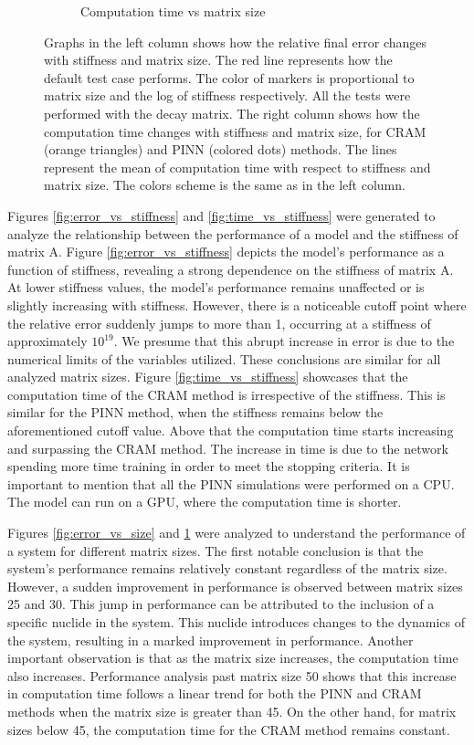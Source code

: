 \documentclass[10pt]{article}
\begin{document}
\begin{figure}
\begin{subfigure}[b]{0.48\textwidth}
         \caption{Computation time vs matrix size}
         \label{fig:time_vs_size}
     \end{subfigure}
        \caption{Graphs in the left column shows how the relative final error changes with stiffness and matrix size. The red line represents how the default test case performs. The color of markers is proportional to matrix size and the log of stiffness respectively. All the tests were performed with the decay matrix. The right column shows how the computation time changes with stiffness and matrix size, for CRAM (orange triangles) and PINN (colored dots) methods. The lines represent the mean of computation time with respect to stiffness and matrix size. The colors scheme is the same as in the left column.}
        \label{fig:three graphs}
\end{figure}

Figures \ref{fig:error_vs_stiffness} and \ref{fig:time_vs_stiffness} were generated to analyze the relationship between the performance of a model and the stiffness of matrix A. Figure \ref{fig:error_vs_stiffness} depicts the model's performance as a function of stiffness, revealing a strong dependence on the stiffness of matrix A. At lower stiffness values, the model's performance remains unaffected or is slightly increasing with stiffness. However, there is a noticeable cutoff point where the relative error suddenly jumps to more than 1, occurring at a stiffness of approximately $10^{19}$. We presume that this abrupt increase in error is due to the numerical limits of the variables utilized. These conclusions are similar for all analyzed matrix sizes. Figure \ref{fig:time_vs_stiffness} showcases that the computation time of the CRAM method is irrespective of the stiffness. This is similar for the PINN method, when the stiffness remains below the aforementioned cutoff value. Above that the computation time starts increasing and surpassing the CRAM method. The increase in time is due to the network spending more time training in order to meet the stopping criteria. It is important to mention that all the PINN simulations were performed on a CPU. The model can run on a GPU, where the computation time is shorter.

Figures \ref{fig:error_vs_size} and \ref{fig:time_vs_size} were analyzed to understand the performance of a system for different matrix sizes. The first notable conclusion is that the system's performance remains relatively constant regardless of the matrix size. However, a sudden improvement in performance is observed between matrix sizes 25 and 30. This jump in performance can be attributed to the inclusion of a specific nuclide in the system. This nuclide introduces changes to the dynamics of the system, resulting in a marked improvement in performance. Another important observation is that as the matrix size increases, the computation time also increases. Performance analysis past matrix size 50 shows that this increase in computation time follows a linear trend for both the PINN and CRAM methods when the matrix size is greater than 45. On the other hand, for matrix sizes below 45, the computation time for the CRAM method remains constant.
\end{document}
